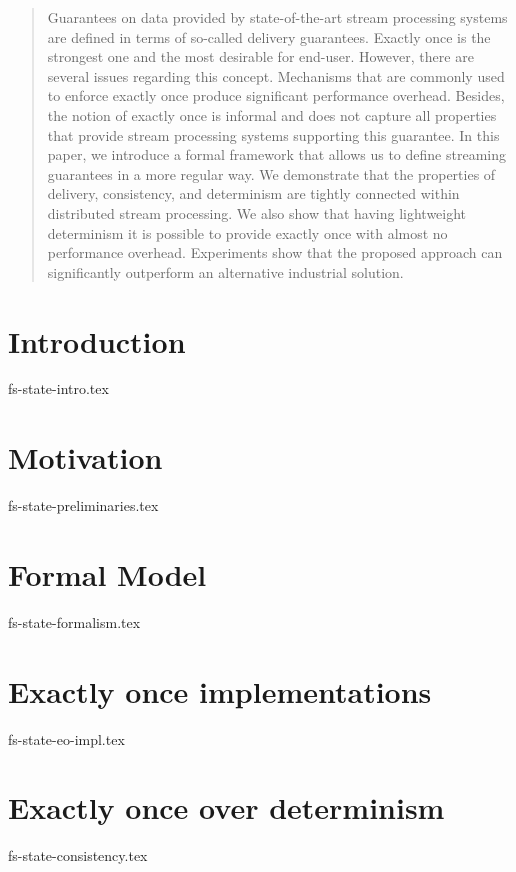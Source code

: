 \documentclass[conference]{IEEEtran}
\theoremstyle{definition}
\begin{document}
\begin{abstract}
Guarantees on data provided by state-of-the-art stream processing systems are defined in terms of so-called delivery guarantees. Exactly once is the strongest one and the most desirable for end-user. However, there are several issues regarding this concept. Mechanisms that are commonly used to enforce exactly once produce significant performance overhead. Besides, the notion of exactly once is informal and does not capture all properties that provide stream processing systems supporting this guarantee. In this paper, we introduce a formal framework that allows us to define streaming guarantees in a more regular way. We demonstrate that the properties of delivery, consistency, and determinism are tightly connected within distributed stream processing. We also show that having lightweight determinism it is possible to provide exactly once with almost no performance overhead. Experiments show that the proposed approach can significantly outperform an alternative industrial solution.
\end{abstract}

\section {Introduction}
 {fs-state-intro.tex}

\section {Motivation}
 {fs-state-preliminaries.tex}

\section {Formal Model}
 {fs-state-formalism.tex}

\section {Exactly once implementations}
 {fs-state-eo-impl.tex}



\section{Exactly once over determinism}
  {fs-state-consistency.tex}
\end{document}
